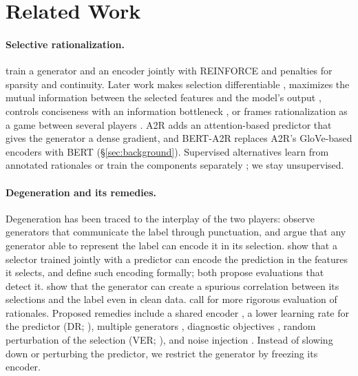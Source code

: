 \documentclass[11pt]{article}
\begin{document}
\section{Related Work}

\paragraph{Selective rationalization.}
\citet{lei-etal-2016-rationalizing} train a generator and an encoder jointly with REINFORCE and penalties for sparsity and continuity. Later work makes selection differentiable \citep{bastings-etal-2019-interpretable}, maximizes the mutual information between the selected features and the model's output \citep{chen2018learning}, controls conciseness with an information bottleneck \citep{paranjape-etal-2020-information}, or frames rationalization as a game between several players \citep{chang2019game,chang2020invariant}. A2R \citep{yu2021understanding} adds an attention-based predictor that gives the generator a dense gradient, and BERT-A2R \citep{storek-etal-2023-unsupervised} replaces A2R's GloVe-based encoders with BERT (\S\ref{sec:background}). Supervised alternatives learn from annotated rationales \citep{zaidan-etal-2007-using,deyoung-etal-2020-eraser} or train the components separately \citep{jain-etal-2020-learning}; we stay unsupervised.

\paragraph{Degeneration and its remedies.}
Degeneration has been traced to the interplay of the two players: \citet{yu-etal-2019-rethinking} observe generators that communicate the label through punctuation, and \citet{jacovi-goldberg-2021-aligning} argue that any generator able to represent the label can encode it in its selection. \citet{jethani-etal-2021-learned} show that a selector trained jointly with a predictor can encode the prediction in the features it selects, and \citet{puli-etal-2024-explanations} define such encoding formally; both propose evaluations that detect it. \citet{liu2025a2i} show that the generator can create a spurious correlation between its selections and the label even in clean data. \citet{zheng-etal-2022-irrationality} call for more rigorous evaluation of rationales. Proposed remedies include a shared encoder \citep{liu2022fr}, a lower learning rate for the predictor (DR; \citealp{liu2023dr}), multiple generators \citep{liu-etal-2023-mgr}, diagnostic objectives \citep{atanasova2022diagnostics}, random perturbation of the selection (VER; \citealp{liu-etal-2025-exploring}), and noise injection \citep{storek-etal-2023-unsupervised}. Instead of slowing down or perturbing the predictor, we restrict the generator by freezing its encoder.
\end{document}
